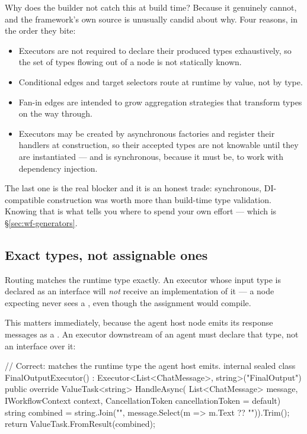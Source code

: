 Why does the builder not catch this at build time? Because it genuinely cannot,
and the framework's own source is unusually candid about why. Four reasons, in
the order they bite:

\begin{itemize}[leftmargin=1.4em]
\item Executors are not required to declare their produced types exhaustively, so
      the set of types flowing out of a node is not statically known.
\item Conditional edges and target selectors route at runtime by value, not by
      type.
\item Fan-in edges are intended to grow aggregation strategies that transform
      types on the way through.
\item Executors may be created by asynchronous factories and register their
      handlers at construction, so their accepted types are not knowable until
      they are instantiated --- and  is synchronous, because it must
      be, to work with dependency injection.
\end{itemize}

The last one is the real blocker and it is an honest trade: synchronous,
DI-compatible construction was worth more than build-time type validation. Knowing
that is what tells you where to spend your own effort --- which is
\S\ref{sec:wf-generators}.

\subsection{Exact types, not assignable ones}

Routing matches the runtime type exactly. An executor whose input type is
declared as an interface will \emph{not} receive an implementation of it --- a
node expecting  never sees a
, even though the assignment would compile.

This matters immediately, because the agent host node emits its response messages
as a . An executor downstream of an agent must declare
that type, not an interface over it:

\begin{csharp}[caption={Declaring the type an agent actually sends}, label={lst:wf-agent-downstream}]
// Correct: matches the runtime type the agent host emits.
internal sealed class FinalOutputExecutor()
    : Executor<List<ChatMessage>, string>("FinalOutput")
{
    public override ValueTask<string> HandleAsync(
        List<ChatMessage> message,
        IWorkflowContext context,
        CancellationToken cancellationToken = default)
    {
        string combined = string.Join("\n", message.Select(m => m.Text ?? "")).Trim();
        return ValueTask.FromResult(combined);
    }
}
\end{csharp}

